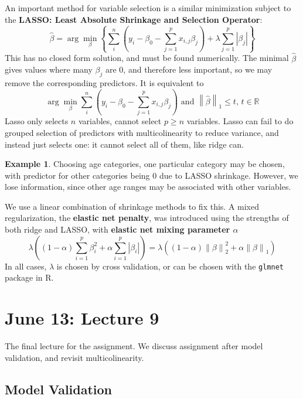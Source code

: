 \documentclass[12pt, a4paper]{article}
\theoremstyle{definition}
\newtheorem{example}{Example}
\newcommand{\R}{\mathbb{R}}                           %
\newcommand{\lam}{\lambda}
\newcommand{\abs}[1]{\left| #1 \right|}
\newcommand{\BB}[1]{\left(#1\right)}
\newcommand{\norm}[1]{\left\lVert#1\right\rVert}
\begin{document}
	  An important method for variable selection is a similar minimization subject to the {\bf LASSO: Least Absolute Shrinkage and Selection Operator}:
	  $$
	  \hat \beta = \arg\min_\beta \left\{ \sum_i^n \BB{y_i - \beta_0 - \sum_{j=1}^p x_{i,j} \beta_j} + \lambda \sum_{j=1}^p \abs{\beta_j}  \right\}
	  $$
	  This has no closed form solution, and must be found numerically. The minimal $\hat \beta$ gives values where many $\beta_j$ are $0$, and therefore less important, so we may remove the corresponding predictors. It is equivalent to
		$$
			\arg\min_\beta \sum_i^n \BB{y_i - \beta_0 - \sum_{j=1}^p x_{i,j} \beta_j} \text{ and } \norm{\hat \beta}_1 \leq t,\, t \in \R
		$$
	Lasso only selects $n$ variables, cannot select $p \geq n$ variables. Lasso can fail to do grouped selection of predictors with multicolinearity to reduce variance, and instead just selects one: it cannot select all of them, like ridge can.
	\begin{example}
		Choosing age categories, one particular category may be chosen, with predictor for other categories being $0$ due to LASSO shrinkage. However, we lose information, since other age ranges may be associated with other variables.
	\end{example}
	
	 We use a linear combination of shrinkage methods to fix this. A mixed regularization, the {\bf elastic net penalty}, was introduced using the strengths of both ridge and LASSO, with {\bf elastic net  mixing parameter $\alpha$}
	$$
		\lambda \BB{(1-\alpha) \sum_{i=1}^p \beta_i^2 + \alpha \sum_{i=1}^p \abs{\beta_i}} = \lambda \BB{ (1-\alpha) \norm{\beta}_2^2 + \alpha \norm{\beta}_1 } 
	$$
	In all cases, $\lam$ is chosen by cross validation, or can be chosen with the \verb*|glmnet| package in R.
	
	\newpage
	\section{June 13: Lecture 9}
	
	The final lecture for the assignment. We discuss assignment after model validation, and revisit multicolinearity. 
	
	\subsection{Model Validation}
	
\end{document}
